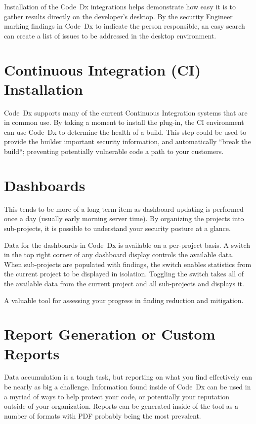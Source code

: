 \documentclass[11pt]{article}
\newcommand\codedx{{\color{blue}Code~Dx}\xspace}
\begin{document}
Installation of the \codedx integrations helps demonstrate how easy it is to gather results directly on the
developer's desktop.  By the security Engineer marking findings in \codedx to indicate the person responsible,
an easy search can create a list of issues to be addressed in the desktop environment.

\section{Continuous Integration (CI) Installation}

\codedx supports many of the current Continuous Integration systems that are in common use.  By
taking a moment to install the plug-in, the CI environment can use \codedx to determine the health of
a build.  This step could be used to provide the builder important security information, and automatically
``break the build``; preventing potentially vulnerable code a path to your customers.

\section{Dashboards}

This tends to be more of a long term item as  dashboard updating is performed once a day (usually
early morning server time).  By organizing the projects into sub-projects, it is possible to understand
your security posture at a glance.

Data for the dashboards in \codedx is available on a per-project basis.  A switch in the top right corner
of any dashboard display controls the available data.  When sub-projects are populated with
findings, the switch enables statistics from the current project to be displayed in isolation.  Toggling the
switch takes all of the available data from the current project and all sub-projects and displays it.

A valuable tool for assessing your progress in finding reduction and mitigation.

\section{Report Generation or Custom Reports}

Data accumulation is a tough task, but reporting on what you find effectively can be nearly as big a
challenge.  Information found inside of \codedx can be used in a myriad of ways to help protect your
code, or potentially your reputation outside of your organization.  Reports can be generated inside of
the tool as a number of formats with PDF probably being the most prevalent.
\end{document}
